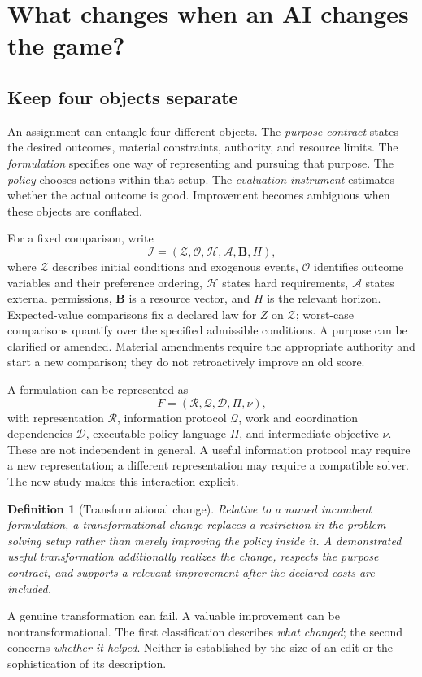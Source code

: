 \documentclass[11pt,letterpaper]{article}
\newcommand{\I}{\mathcal I}\newcommand{\A}{\mathcal A}
\newtheorem{definition}{Definition}[section]
\theoremstyle{remark}\newtheorem{remark}{Remark}[section]
\begin{document}
\section{What changes when an AI changes the game?}\label{sec:objects}
\subsection{Keep four objects separate}
An assignment can entangle four different objects. The \emph{purpose contract} states the desired outcomes, material constraints, authority, and resource limits. The \emph{formulation} specifies one way of representing and pursuing that purpose. The \emph{policy} chooses actions within that setup. The \emph{evaluation instrument} estimates whether the actual outcome is good. Improvement becomes ambiguous when these objects are conflated.

For a fixed comparison, write
\begin{equation}
\I=(\mathcal Z,\mathcal O,\mathcal H,\A,\mathbf B,H),
\end{equation}
where $\mathcal Z$ describes initial conditions and exogenous events, $\mathcal O$ identifies outcome variables and their preference ordering, $\mathcal H$ states hard requirements, $\A$ states external permissions, $\mathbf B$ is a resource vector, and $H$ is the relevant horizon. Expected-value comparisons fix a declared law for $Z$ on $\mathcal Z$; worst-case comparisons quantify over the specified admissible conditions. A purpose can be clarified or amended. Material amendments require the appropriate authority and start a new comparison; they do not retroactively improve an old score.

A formulation can be represented as
\begin{equation}
F=(\mathcal R,\mathcal Q,\mathcal D,\Pi,\nu),
\end{equation}
with representation $\mathcal R$, information protocol $\mathcal Q$, work and coordination dependencies $\mathcal D$, executable policy language $\Pi$, and intermediate objective $\nu$. These are not independent in general. A useful information protocol may require a new representation; a different representation may require a compatible solver. The new study makes this interaction explicit.

\begin{definition}[Transformational change]
Relative to a named incumbent formulation, a transformational change replaces a restriction in the problem-solving setup rather than merely improving the policy inside it. A \emph{demonstrated useful transformation} additionally realizes the change, respects the purpose contract, and supports a relevant improvement after the declared costs are included.
\end{definition}
A genuine transformation can fail. A valuable improvement can be nontransformational. The first classification describes \emph{what changed}; the second concerns \emph{whether it helped}. Neither is established by the size of an edit or the sophistication of its description.
\end{document}
